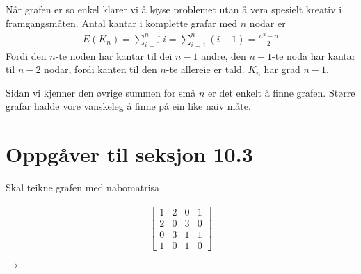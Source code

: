 \documentclass[a4paper, 11pt]{article}
\newcommand{\Themecolor}{Black} %
\newcommand{\Themetext}[1]{\textcolor{\Themecolor}{#1}}
\newcommand{\MajorTask}[1]{
  \vspace{5mm}
  \reversemarginpar
  \marginnote{\LARGE\bfseries \Themetext{#1}}
}
\begin{document}
\noindent
Når grafen er so enkel klarer vi å løyse problemet utan å vera spesielt kreativ i framgangsmåten.
Antal kantar i komplette grafar med \(n\) nodar er
\begin{align*}
  E(K_n) = \sum_{i=0}^{n-1}i=\sum_{i=1}^{n}(i - 1) = \frac{n^2 -n}{2}
\end{align*}
Fordi den \(n\)-te noden har kantar til dei \(n-1\) andre, den \(n-1\)-te noda
har kantar til \(n-2\) nodar, fordi kanten til den \(n\)-te allereie er tald.
\(K_n\) har grad \(n-1\).

\vspace{2mm} \noindent
Sidan vi kjenner den øvrige summen for små \(n\) er det enkelt å finne grafen.
Større grafar hadde vore vanskeleg å finne på ein like naiv måte.


\section*{Oppgåver til seksjon 10.3} \vspace{-5mm}
\MajorTask{17} \noindent
Skal teikne grafen med nabomatrisa

\begin{center}
\begin{minipage}{.4\textwidth}
  \begin{align*}
    \begin{bmatrix}
      1 & 2 & 0 & 1 \\
      2 & 0 & 3 & 0 \\
      0 & 3 & 1 & 1 \\
      1 & 0 & 1 & 0
    \end{bmatrix}
  \end{align*}
\end{minipage}
\(\rightarrow\)
\begin{minipage}{.4\textwidth}
  \centering
\end{minipage}
\end{center}
\end{document}
